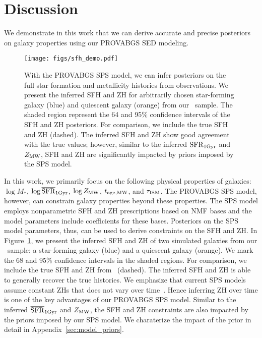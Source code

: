 \section{Discussion} \label{sec:discuss}
We demonstrate in this work that we can derive accurate and precise posteriors
on galaxy properties using our {\sc PROVABGS} SED modeling. 




\begin{figure}
\begin{center}
\texttt{[image: figs/sfh\_demo.pdf]}
    \caption{
        With the {\sc PROVABGS} SPS model, we can infer posteriors on the full
        star formation and metallicity histories from observations. 
        We present the inferred SFH and ZH for arbitrarily chosen star-forming
        galaxy (blue) and quiescent galaxy (orange) from our \lgal~sample.
        The shaded region represent the 64 and 95\% confidence intervals of the
        SFH and ZH posteriors. 
        For comparison, we include the true SFH and ZH (dashed). 
        The inferred SFH and ZH show good agreement with the true values;
        however, similar to the inferred $\overline{\rm SFR}_{\rm 1Gyr}$ and $Z_{\rm MW}$, SFH and ZH are
        significantly impacted by priors imposed by the SPS model. 
    } \label{fig:sfh_demo}
\end{center}
\end{figure}


In this work, we primarily focus on the following physical properties of
galaxies: $\log M_*$, $\log\overline{\rm SFR}_{\rm 1Gyr}$, $\log Z_{\rm MW}$, $t_{\rm age, MW}$, and $\tau_{\rm ISM}$. 
The {\sc PROVABGS} SPS model, however, can constrain galaxy properties beyond
these properties. 
The SPS model employs nonparametric SFH and ZH prescriptions based on NMF bases
and the model parameters include coefficients for these bases. 
Posteriors on the SPS model parameters, thus, can be used to derive constraints
on the SFH and ZH. 
In Figure~\ref{fig:sfh_demo}, we present the inferred SFH and ZH of two
simulated galaxies from our \lgal~sample: a star-forming galaxy (blue) and a
quiescent galaxy (orange). 
We mark the 68 and 95\% confidence intervals in the shaded regions. 
For comparison, we include the true SFH and ZH from \lgal~(dashed).  
The inferred SFH and ZH is able to generally recover the true histories. 
We emphasize that current SPS models assume constant ZHs that does not vary
over time~\citep{carnall2017, leja2019}. 
Hence inferring ZH over time is one of the key advantages of our {\sc PROVABGS}
SPS model. 
Similar to the inferred $\overline{\rm SFR}_{\rm 1Gyr}$ and $Z_{\rm MW}$, the SFH and ZH constraints are
also impacted by the priors imposed by our SPS model. 
We charaterize the impact of the prior in detail in
Appendix~\ref{sec:model_priors}.

